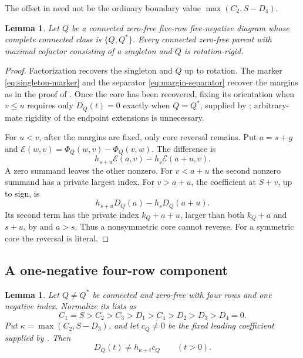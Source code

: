 \documentclass[11pt,a4paper]{amsart}
\numberwithin{equation}{section}
\theoremstyle{plain}
\newtheorem{lemma}[theorem]{Lemma}
\theoremstyle{definition}
\begin{document}
The offset in  need not be the ordinary
boundary value \(\max(C_2,S-D_4)\).

\begin{lemma}\label{lem:singleton-five-rigid}
Let \(Q\) be a connected zero-free five-row five-negative diagram whose
complete connected class is \(\{Q,Q^*\}\).  Every connected zero-free
parent with maximal cofactor consisting of a singleton and \(Q\) is
rotation-rigid.
\end{lemma}

\begin{proof}
Factorization recovers the singleton and \(Q\) up to rotation.  The
marker \eqref{eq:singleton-marker} and the separator
\eqref{eq:margin-separator} recover the margins as in the proof of
.  Once the core has been recovered, fixing
its orientation when \(v\le u\) requires only
\(D_Q(t)=0\) exactly when \(Q=Q^*\), supplied by
; arbitrary-mate rigidity of the endpoint
extensions is unnecessary.

For \(u<v\), after the margins are fixed, only core reversal remains.
Put \(a=s+g\) and
\(\mathcal E(w,v)=\Phi_Q(w,v)-\Phi_Q(v,w)\).
The difference is
\[
 h_{s+u}\mathcal E(a,v)-h_s\mathcal E(a+u,v).
\]
A zero summand leaves the other nonzero.  For \(v<a+u\) the second
nonzero summand has a private largest index.  For \(v>a+u\), the
coefficient at \(S+v\), up to sign, is
\[
 h_{s+u}D_Q(a)-h_sD_Q(a+u).
\]
Its second term has the private index \(k_Q+a+u\), larger than both
\(k_Q+a\) and \(s+u\), by  and
\(a>s\).  Thus a nonsymmetric core cannot reverse.  For a symmetric
core the reversal is literal.
\end{proof}

\subsection{A one-negative four-row component}

\begin{lemma}\label{lem:one-negative-four-lower}
Let \(Q\ne Q^*\) be connected and zero-free with four rows and one
negative index.  Normalize its lists as
\begin{equation}\label{eq:one-negative-four-lists}
 C_1=S>C_2>C_3>D_1>C_4>D_2>D_3>D_4=0.
\end{equation}
Put \(\kappa=\max(C_2,S-D_3)\), and let \(c_Q\ne0\) be the
fixed leading coefficient supplied by .
Then
\begin{equation}\label{eq:one-negative-four-remainder}
 D_Q(t)\ne h_{\kappa+t}c_Q\qquad(t>0).
\end{equation}
\end{lemma}
\end{document}
